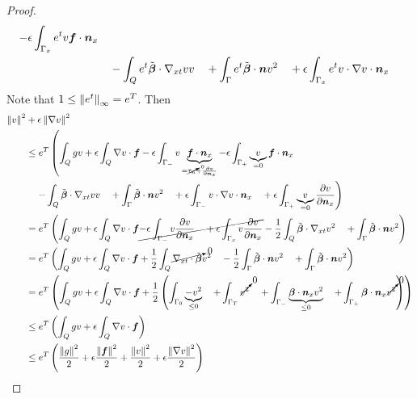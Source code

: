 \documentclass{article}
\theoremstyle{definition}
\theoremstyle{remark}
\begin{document}
\begin{proof}
\begin{align*}
-\epsilon\int_{\Gamma_x}e^{t}v\boldsymbol f\cdot\boldsymbol n_x\\
&\quad-\int_Qe^{t}\tilde{\boldsymbol\beta}\cdot\nabla_{xt} vv
\quad+\int_\Gamma e^{t}\tilde{\boldsymbol\beta}\cdot\boldsymbol n v^2
\quad+\epsilon\int_{\Gamma_x}e^{t}v\cdot\nabla v\cdot\boldsymbol n_x
\end{align*}
Note that $1\leq\left\| e^t \right\|_\infty=e^T$.
Then
\begin{align*}
\left\| v \right\|^2
&+\epsilon\left\| \nabla v \right\|^2
\\
&\leq
e^T\left(
\int_Qgv
+\epsilon\int_Q\nabla v\cdot\boldsymbol f
-\epsilon\int_{\Gamma_-}v\underbrace{\boldsymbol f\cdot\boldsymbol n_x}_{=\cancelto{0}{\tau_n}+\frac{\partial v}{\partial\boldsymbol n_x}}
-\epsilon\int_{\Gamma_+}\underbrace{v}_{=0}\boldsymbol f\cdot\boldsymbol n_x
\right.\\
&\left.
\quad-\int_Q\tilde{\boldsymbol\beta}\cdot\nabla_{xt} vv
\quad+\int_\Gamma \tilde{\boldsymbol\beta}\cdot\boldsymbol n v^2
\quad+\epsilon\int_{\Gamma_-}v\cdot\nabla v\cdot\boldsymbol n_x
\quad+\epsilon\int_{\Gamma_+}\underbrace{v}_{=0}\frac{\partial v}{\partial\boldsymbol n_x}
\right)
\\
&=
e^T\left(
\int_Qgv
+\epsilon\int_Q\nabla v\cdot\boldsymbol f
\cancel{
-\epsilon\int_{\Gamma_-}v\frac{\partial v}{\partial\boldsymbol n_x}
\quad+\epsilon\int_{\Gamma_x}v\frac{\partial v}{\partial\boldsymbol n_x}
}
-\frac{1}{2}\int_Q\tilde{\boldsymbol\beta}\cdot\nabla_{xt} v^2
\quad+\int_\Gamma \tilde{\boldsymbol\beta}\cdot\boldsymbol n v^2
\right)
\\
&=
e^T\left(
\int_Qgv
+\epsilon\int_Q\nabla v\cdot\boldsymbol f
+\frac{1}{2}\int_Q\cancelto{0}{\nabla_{xt}\cdot\tilde{\boldsymbol\beta}} v^2
\quad-\frac{1}{2}\int_\Gamma\tilde{\boldsymbol\beta}\cdot\boldsymbol n v^2
\quad+\int_\Gamma \tilde{\boldsymbol\beta}\cdot\boldsymbol n v^2
\right)
\\
&=
e^T\left(
\int_Qgv
+\epsilon\int_Q\nabla v\cdot\boldsymbol f
+\frac{1}{2}\left( \int_{\Gamma_0} \underbrace{-v^2}_{\leq 0}
\quad+\int_{\Gamma_T} \cancelto{0}{v^2}
\quad+\int_{\Gamma_-} \underbrace{\boldsymbol\beta\cdot\boldsymbol n_x v^2}_{\leq 0}
\quad+\int_{\Gamma_+} \boldsymbol\beta\cdot\boldsymbol n_x \cancelto{0}{v^2}
 \right)
\right)
\\
&\leq
e^T\left(
\int_Qgv
+\epsilon\int_Q\nabla v\cdot\boldsymbol f
\right)
\\
&\leq
e^T\left(
\frac{\left\| g \right\|^2}{2}
+\epsilon\frac{\left\| \boldsymbol f \right\|^2}{2}
+\frac{\left\| v \right\|^2}{2}
+\epsilon\frac{\left\| \nabla v \right\|^2}{2}
\right)
\end{align*}
\end{proof}
\end{document}
